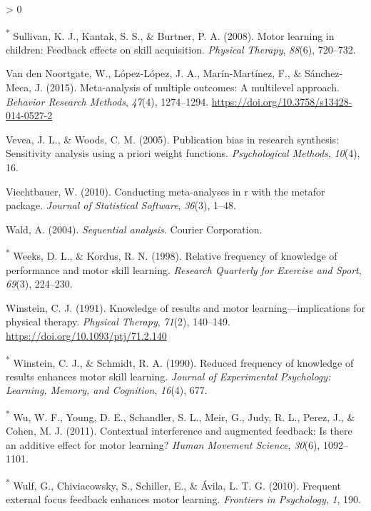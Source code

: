 \documentclass[
  english,
  man, donotrepeattitle,floatsintext]{apa7}
\newlength{\cslhangindent}
\newenvironment{CSLReferences}[2] %
 {%
  \setlength{\parindent}{0pt}
  \ifodd #1 \everypar{\setlength{\hangindent}{\cslhangindent}}\ignorespaces\fi
  \ifnum #2 > 0
  \setlength{\parskip}{#2\baselineskip}
  \fi
 }%
 {}
\begin{document}
\begin{CSLReferences}{1}{0}
\leavevmode\hypertarget{ref-Sullivan2008}{}%
\textsuperscript{*} Sullivan, K. J., Kantak, S. S., \& Burtner, P. A. (2008). Motor learning in children: Feedback effects on skill acquisition. \emph{Physical Therapy}, \emph{88}(6), 720--732.

\leavevmode\hypertarget{ref-VandenNoortgate2015}{}%
Van den Noortgate, W., López-López, J. A., Marín-Martínez, F., \& Sánchez-Meca, J. (2015). Meta-analysis of multiple outcomes: A multilevel approach. \emph{Behavior Research Methods}, \emph{47}(4), 1274--1294. \url{https://doi.org/10.3758/s13428-014-0527-2}

\leavevmode\hypertarget{ref-Vevea2005}{}%
Vevea, J. L., \& Woods, C. M. (2005). Publication bias in research synthesis: Sensitivity analysis using a priori weight functions. \emph{Psychological Methods}, \emph{10}(4), 16.

\leavevmode\hypertarget{ref-Viechtbauer2010}{}%
Viechtbauer, W. (2010). Conducting meta-analyses in r with the metafor package. \emph{Journal of Statistical Software}, \emph{36}(3), 1--48.

\leavevmode\hypertarget{ref-Wald2004}{}%
Wald, A. (2004). \emph{Sequential analysis}. Courier Corporation.

\leavevmode\hypertarget{ref-Weeks1998}{}%
\textsuperscript{*} Weeks, D. L., \& Kordus, R. N. (1998). Relative frequency of knowledge of performance and motor skill learning. \emph{Research Quarterly for Exercise and Sport}, \emph{69}(3), 224--230.

\leavevmode\hypertarget{ref-Winstein1991}{}%
Winstein, C. J. (1991). Knowledge of results and motor learning---implications for physical therapy. \emph{Physical Therapy}, \emph{71}(2), 140--149. \url{https://doi.org/10.1093/ptj/71.2.140}

\leavevmode\hypertarget{ref-Winstein1990}{}%
\textsuperscript{*} Winstein, C. J., \& Schmidt, R. A. (1990). Reduced frequency of knowledge of results enhances motor skill learning. \emph{Journal of Experimental Psychology: Learning, Memory, and Cognition}, \emph{16}(4), 677.

\leavevmode\hypertarget{ref-Wu2011}{}%
\textsuperscript{*} Wu, W. F., Young, D. E., Schandler, S. L., Meir, G., Judy, R. L., Perez, J., \& Cohen, M. J. (2011). Contextual interference and augmented feedback: Is there an additive effect for motor learning? \emph{Human Movement Science}, \emph{30}(6), 1092--1101.

\leavevmode\hypertarget{ref-Wulf2010}{}%
\textsuperscript{*} Wulf, G., Chiviacowsky, S., Schiller, E., \& Ávila, L. T. G. (2010). Frequent external focus feedback enhances motor learning. \emph{Frontiers in Psychology}, \emph{1}, 190.


\end{CSLReferences}
\end{document}
